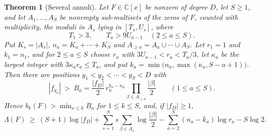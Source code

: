 \documentclass[11pt]{article}
\newtheorem{theorem}{Theorem}[section]
\begin{document}
\begin{theorem}[Several annuli]\label{thm:annuli}
Let $F\in\mathbb C[x]$ be nonzero of degree $D$, let $S\ge1$, and let
$A_1,\ldots,A_S$ be nonempty sub-multisets of the zeros of $F$, counted with
multiplicity, the moduli in $A_s$ lying in $[T_s,U_s]$, where
\[
  T_1>3,\qquad T_a>9U_{a-1}\quad(2\le a\le S).
\]
Put $K_s=|A_s|$, $n_a=K_a+\cdots+K_S$ and $A_{\ge a}=A_a\cup\cdots\cup A_S$.
Let $r_1=1$ and $k_1=n_1$, and for $2\le a\le S$ choose $r_a$ with
$3U_{a-1}<r_a<T_a/3$, let $\kappa_a$ be the largest integer with
$3\kappa_ar_a\le T_a$, and put $k_a=\min\bigl(n_a,\max(\kappa_a,S-a+1)\bigr)$.
Then there are positions $y_1<y_2<\cdots<y_S<D$ with
\[
  |f_{y_a}|\ >\ B_a=\frac{|f_D|}2\,r_a^{k_a-n_a}\prod_{\beta\in A_{\ge a}}\frac{|\beta|}2
  \qquad(1\le a\le S).
\]
Hence $b_k(F)>\min_{a\le k}B_a$ for $1\le k\le S$, and, if $|f_D|\ge1$,
\[
  \Lambda(F)\ \ge\ (S+1)\log|f_D|+\sum_{s=1}^Ss\sum_{\beta\in A_s}\log\frac{|\beta|}2
  -\sum_{a=2}^S(n_a-k_a)\log r_a-S\log2 .
\]
\end{theorem}
\end{document}
